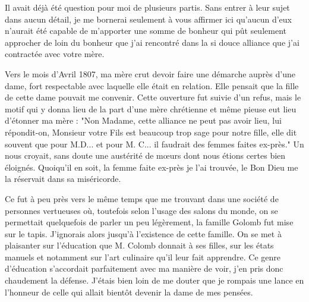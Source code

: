 \documentclass[11pt,a4paper]{report}
\begin{document}
Il avait déjà été question pour moi de plusieurs partis. Sans entrer à leur sujet dans aucun détail, je me bornerai seulement à vous affirmer ici qu'aucun d'eux n'aurait été capable de m'apporter une somme de bonheur qui pût seulement approcher de loin du bonheur que j'ai rencontré dans la si douce alliance que j'ai contractée avec votre mère.

Vers le mois d'Avril 1807, ma mère crut devoir faire une démarche auprès d'une dame, fort respectable avec laquelle elle était en relation. Elle pensait que la fille de cette dame pouvait me convenir. Cette ouverture fut suivie d'un refus, mais le motif qui y donna lieu de la part d'une mère chrétienne et même pieuse eut lieu d'étonner ma mère : "Non Madame, cette alliance ne peut pas avoir lieu, lui répondit-on, Monsieur votre Fils est beaucoup trop sage pour notre fille, elle dit souvent que pour M.D... et pour M. C... il faudrait des femmes faites ex-près." Un nous croyait, sans doute une austérité de mœurs dont nous étions certes bien éloignés. Quoiqu'il en soit, la femme faite ex-près je l'ai trouvée, le Bon Dieu me la réservait dans sa miséricorde.

Ce fut à peu près vers le même temps que me trouvant dans une société de personnes vertueuses où, toutefois selon l'usage des salons du monde, on se permettait quelquefois de parler un peu légèrement, la famille Golomb fut mise sur le tapis. J'ignorais alors jusqu'à l'existence de cette famille. On se met à plaisanter sur l'éducation que M. Colomb donnait à ses filles, sur les états manuels et notamment sur l'art culinaire qu'il leur fait apprendre. Ce genre d'éducation s'accordait parfaitement avec ma manière de voir, j'en pris donc chaudement la défense. J'étais bien loin de me douter que je rompais une lance en l'honneur de celle qui allait bientôt devenir la dame de mes pensées.
\end{document}
